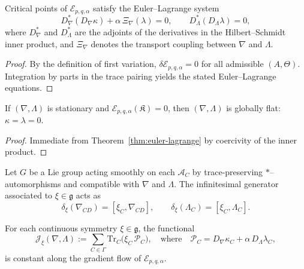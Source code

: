 \begin{theorem}\label{thm:euler-lagrange}
Critical points of $\mathcal E_{p,q,\alpha}$ satisfy the Euler–Lagrange system
\[
D_\nabla^*(D_\nabla\kappa)+\alpha\,\Xi_\nabla(\lambda)=0,
\qquad
D_\Lambda^*(D_\Lambda\lambda)=0,
\]
where $D_\nabla^*$ and $D_\Lambda^*$ are the adjoints of the derivatives in the Hilbert–Schmidt inner product, and $\Xi_\nabla$ denotes the transport coupling between $\nabla$ and $\Lambda$.
\end{theorem}

\begin{proof}
By the definition of first variation, $\delta\mathcal E_{p,q,\alpha}=0$ for all admissible $(A,\Theta)$.
Integration by parts in the trace pairing yields the stated Euler–Lagrange equations. \relax
\end{proof}

\begin{corollary}\label{cor:stationary-flat}
If $(\nabla,\Lambda)$ is stationary and $\mathcal E_{p,q,\alpha}(\mathfrak K)=0$, then $(\nabla,\Lambda)$ is globally flat: $\kappa=\lambda=0$.
\end{corollary}

\begin{proof}
Immediate from Theorem~\ref{thm:euler-lagrange} by coercivity of the inner product. \relax
\end{proof}


\begin{definition}\label{def:symmetry-group}
Let $G$ be a Lie group acting smoothly on each $\mathcal A_C$ by trace-preserving $*$–automorphisms and compatible with $\nabla$ and $\Lambda$. 
The infinitesimal generator associated to $\xi\in\mathfrak g$ acts as
\[
\delta_\xi(\nabla_{CD})=[\xi_C,\nabla_{CD}],\qquad 
\delta_\xi(\Lambda_C)=[\xi_C,\Lambda_C].
\]
\end{definition}

\begin{theorem}\label{thm:noether}
For each continuous symmetry $\xi\in\mathfrak g$, the functional
\[
\mathcal J_\xi(\nabla,\Lambda)
:=\sum_{C\in\Gamma}\mathrm{Tr}_C\!\big(\xi_C\,\mathcal P_C\big),
\quad \text{where}\quad
\mathcal P_C=D_\nabla\kappa_C+\alpha\,D_\Lambda\lambda_C,
\]
is constant along the gradient flow of $\mathcal E_{p,q,\alpha}$.
\end{theorem}

